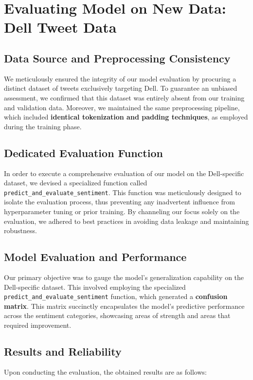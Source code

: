 \section{Evaluating Model on New Data: Dell Tweet Data}

\subsection{Data Source and Preprocessing Consistency}
\vspace{-1em}
We meticulously ensured the integrity of our model evaluation by procuring a distinct dataset of tweets exclusively targeting Dell. To guarantee an unbiased assessment, we confirmed that this dataset was entirely absent from our training and validation data. Moreover, we maintained the same preprocessing pipeline, which included \textbf{identical tokenization and padding techniques}, as employed during the training phase.
\vspace{-1em}
\subsection{Dedicated Evaluation Function}
\vspace{-1em}
In order to execute a comprehensive evaluation of our model on the Dell-specific dataset, we devised a specialized function called \texttt{predict\_and\_evaluate\_sentiment}. This function was meticulously designed to isolate the evaluation process, thus preventing any inadvertent influence from hyperparameter tuning or prior training. By channeling our focus solely on the evaluation, we adhered to best practices in avoiding data leakage and maintaining robustness.
\vspace{-1em}
\subsection{Model Evaluation and Performance}
\vspace{-1em}
Our primary objective was to gauge the model's generalization capability on the Dell-specific dataset. This involved employing the specialized \texttt{predict\_and\_evaluate\_sentiment} function, which generated a \textbf{confusion matrix}. This matrix succinctly encapsulates the model's predictive performance across the sentiment categories, showcasing areas of strength and areas that required improvement.
\vspace{-1em}
\subsection{Results and Reliability}
\vspace{-1em}
Upon conducting the evaluation, the obtained results are as follows:

